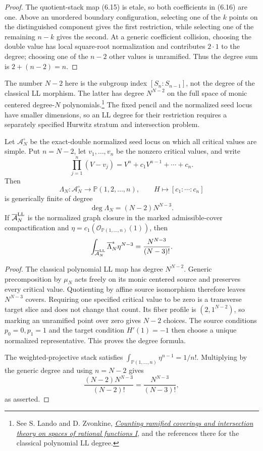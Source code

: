\begin{proof}
The quotient-stack map (6.15) is etale, so both coefficients in (6.16) are
one.  Above an unordered boundary configuration, selecting one of the $k$
points on the distinguished component gives the first restriction, while
selecting one of the remaining $n-k$ gives the second.  At a generic
coefficient collision, choosing the double value has local square-root
normalization and contributes $2\cdot1$ to the degree; choosing one of the
$n-2$ other values is unramified.  Thus the degree sum is
$2+(n-2)=n$.
\end{proof}

\begin{remark}
The number $N-2$ here is the subgroup index $[S_n:S_{n-1}]$, not the degree
of the classical LL morphism.  The latter has degree $N^{N-2}$ on the full
space of monic centered degree-$N$ polynomials.\footnote{See S. Lando and D.
Zvonkine,
\href{https://arxiv.org/abs/math/0303218}{\emph{Counting ramified coverings
and intersection theory on spaces of rational functions I}}, and the
references there for the classical polynomial LL degree.}  The fixed pencil and the
normalized seed locus have smaller dimensions, so an LL degree for their
restriction requires a separately specified Hurwitz stratum and intersection
problem.
\end{remark}

\begin{theorem}
\label{thm:restricted-ll-degree}
Let $\mathcal A_N^\circ$ be the exact-double normalized seed locus on which
all critical values are simple.  Put $n=N-2$, let $v_1,\ldots,v_n$ be the
nonzero critical values, and write
\[
 \prod_{j=1}^n(V-v_j)=V^n+c_1V^{n-1}+\cdots+c_n.
\]
Then
\[
 \Lambda_N:\mathcal A_N^\circ\longrightarrow\mathbb P(1,2,\ldots,n),
 \qquad H\longmapsto[c_1:\cdots:c_n]
\]
is generically finite of degree
\[
 \boxed{\deg\Lambda_N=(N-2)N^{N-3}}.
\]
If $\overline{\mathcal A}^{\rm LL}_N$ is the normalized graph closure in the
marked admissible-cover compactification and
$\eta=c_1(\mathcal O_{\mathbb P(1,\ldots,n)}(1))$, then
\[
 \int_{\overline{\mathcal A}^{\rm LL}_N}
       \overline\Lambda_N^*\eta^{N-3}
 =\frac{N^{N-3}}{(N-3)!}.
\]
\end{theorem}

\begin{proof}
The classical polynomial LL map has degree $N^{N-2}$.  Generic
precomposition by $\mu_N$ acts freely on its monic centered source and
preserves every critical value.  Quotienting by affine source isomorphism
therefore leaves $N^{N-3}$ covers.  Requiring one specified critical value to
be zero is a transverse target slice and does not change that count.  Its
fiber profile is $(2,1^{N-2})$, so marking an unramified point over zero gives
$N-2$ choices.  The source conditions $p_0=0,p_1=1$ and the target condition
$H'(1)=-1$ then choose a unique normalized representative.  This proves the
degree formula.

The weighted-projective stack satisfies
$\int_{\mathbb P(1,\ldots,n)}\eta^{n-1}=1/n!$.  Multiplying by the generic
degree and using $n=N-2$ gives
\[
 \frac{(N-2)N^{N-3}}{(N-2)!}
 =\frac{N^{N-3}}{(N-3)!},
\]
as asserted.
\end{proof}

